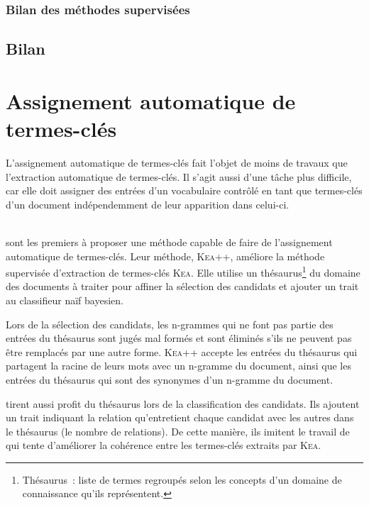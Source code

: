       \subsubsection{Bilan des méthodes supervisées}
      \label{subsubsec:main-state_of_the_art-automatic_keyphrase_extraction-supervised_keyphrase_extraction-conclusion}
        \TODO{\dots}

    \subsection{Bilan}
    \label{subsec:main-state_of_the_art-automatic_keyphrase_extraction-conclusion}
      \TODO{\dots}

  \section{Assignement automatique de termes-clés}
  \label{sec:main-state_of_the_art-automatic_keyphrase_assignment}
    L'assignement automatique de termes-clés fait l'objet de moins de travaux
    que l'extraction automatique de termes-clés. Il s'agit aussi d'une tâche
    plus difficile, car elle doit assigner des entrées d'un vocabulaire contrôlé
    en tant que termes-clés d'un document indépendemment de leur apparition dans
    celui-ci.

    ~\\ sont les premiers à proposer une
    méthode capable de faire de l'assignement automatique de termes-clés. Leur
    méthode, \textsc{Kea}++, améliore la méthode supervisée d'extraction de
    termes-clés \textsc{Kea}. Elle utilise un thésaurus\footnote{Thésaurus~:
    liste de termes regroupés selon les concepts d'un domaine de connaissance
    qu'ils représentent.} du domaine des documents à traiter pour affiner la
    sélection des candidats et ajouter un trait au classifieur naïf bayesien.

    Lors de la sélection des candidats, les n-grammes qui ne font pas partie des
    entrées du thésaurus sont jugés mal formés et sont éliminés s'ils ne peuvent
    pas être remplacés par une autre forme. \textsc{Kea}++ accepte les entrées
    du thésaurus qui partagent la racine de leurs mots avec un n-gramme du
    document, ainsi que les entrées du thésaurus qui sont des synonymes d'un
    n-gramme du document.

     tirent aussi profit du thésaurus lors
    de la classification des candidats. Ils ajoutent un trait indiquant la
    relation qu'entretient chaque candidat avec les autres dans le thésaurus (le
    nombre de relations). De cette manière, ils imitent le travail de
     qui tente d'améliorer la cohérence entre
    les termes-clés extraits par \textsc{Kea}.

